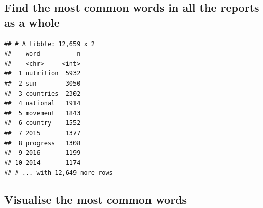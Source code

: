 \documentclass[12pt,a4paper]{article}
\newenvironment{Shaded}{\begin{snugshade}}{\end{snugshade}}
\newcommand{\KeywordTok}[1]{\textcolor[rgb]{0.13,0.29,0.53}{\textbf{#1}}}
\newcommand{\DataTypeTok}[1]{\textcolor[rgb]{0.13,0.29,0.53}{#1}}
\newcommand{\DecValTok}[1]{\textcolor[rgb]{0.00,0.00,0.81}{#1}}
\newcommand{\StringTok}[1]{\textcolor[rgb]{0.31,0.60,0.02}{#1}}
\newcommand{\OtherTok}[1]{\textcolor[rgb]{0.56,0.35,0.01}{#1}}
\newcommand{\OperatorTok}[1]{\textcolor[rgb]{0.81,0.36,0.00}{\textbf{#1}}}
\newcommand{\NormalTok}[1]{#1}
\begin{document}
\hypertarget{find-the-most-common-words-in-all-the-reports-as-a-whole}{%
\subsection{Find the most common words in all the reports as a
whole}\label{find-the-most-common-words-in-all-the-reports-as-a-whole}}

\begin{Shaded}
\end{Shaded}

\begin{verbatim}
## # A tibble: 12,659 x 2
##    word          n
##    <chr>     <int>
##  1 nutrition  5932
##  2 sun        3050
##  3 countries  2302
##  4 national   1914
##  5 movement   1843
##  6 country    1552
##  7 2015       1377
##  8 progress   1308
##  9 2016       1199
## 10 2014       1174
## # ... with 12,649 more rows
\end{verbatim}

\hypertarget{visualise-the-most-common-words}{%
\subsection{Visualise the most common
words}\label{visualise-the-most-common-words}}

\begin{Shaded}
\end{Shaded}
\end{document}
